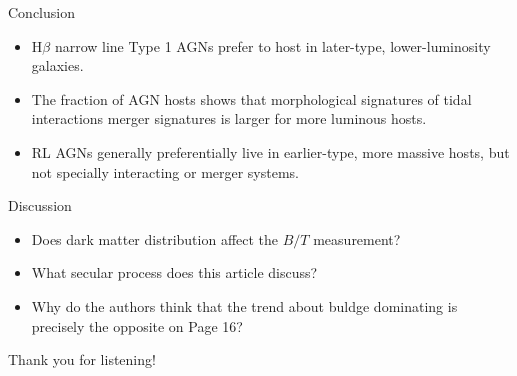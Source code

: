 \documentclass{beamer}
\begin{document}
\begin{frame}{Conclusion}
    \begin{itemize}
        \item H$\beta$ narrow line Type 1 AGNs prefer to host in later-type, lower-luminosity galaxies.
        
        \item The fraction of AGN hosts shows that morphological signatures of tidal interactions merger signatures is larger for more luminous hosts.
        
        \item RL AGNs generally preferentially live in earlier-type, more massive hosts, but not specially interacting or merger systems.
    \end{itemize}
\end{frame}

\begin{frame}{Discussion}
    \begin{itemize}
        \item Does dark matter distribution affect the $B/T$ measurement?
        
        \item What secular process does this article discuss?
        
        \item Why do the authors think that the trend about buldge dominating is precisely the opposite on Page 16?
    \end{itemize}
\end{frame}

\begin{frame}[plain]
    \begin{center}
        \Huge Thank you for listening!
    \end{center}
\end{frame}
\end{document}
